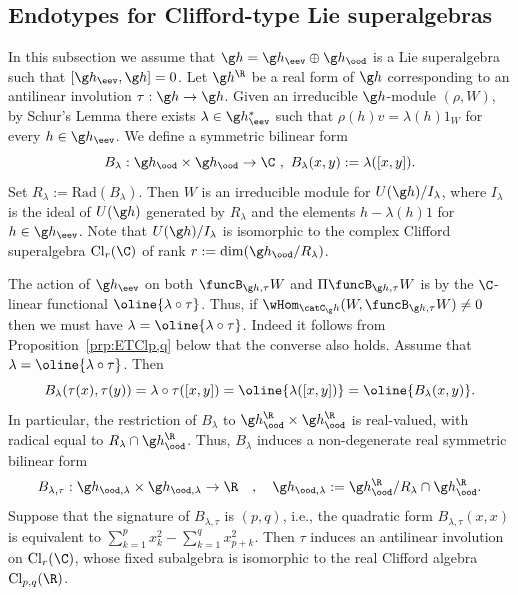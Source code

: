 \documentclass[12pt]{amsart}
\begin{document}
\subsection{Endotypes for Clifford-type Lie superalgebras}  
In  this subsection we assume that  $\g h=\g h_\eev\oplus\g h_\ood$ is a Lie superalgebra such that $[\g h_\eev,\g h]=0$. Let $\g h^\R$ be a real form of $\g h$ corresponding to an antilinear involution $\tau:\g h\to \g h$. Given an irreducible $\g h$-module $(\rho,W)$, by Schur's Lemma there exists $\lambda\in\g h_\eev^*$ such that  $\rho(h)v=\lambda(h)1_W$ for every $h\in \g h_\eev$.
We define a symmetric bilinear form
\[
B_\lambda:\g h_\ood\times \g h_\ood\to \C\ ,\
B_\lambda(x,y):=\lambda([x,y]).
\]
Set $R_\lambda:=\mathrm{Rad}(B_\lambda)$. Then $W$ is an irreducible module for $U(\g h)/I_\lambda$, where $I_\lambda$ is the ideal of $U(\g h)$ generated by $R_\lambda$ and the elements $h-\lambda(h)1$ for $h\in\g h_\eev$. Note that $U(\g h)/I_\lambda$ is isomorphic to the  complex Clifford superalgebra $\mathrm{Cl}_r(\C)$ of rank $r:=\dim(\g h_\ood/R_\lambda)$.  

%


The action of $\g h_\eev$ on both $\funcB_{\g h,\tau} W$ and $\Pi\funcB_{\g h,\tau} W$ is by the $\C$-linear functional $\oline{\lambda\circ\tau}$. Thus, if $\wHom_{\catC_\g h}(W,\funcB_{\g h,\tau}W)\neq 0$ then 
we must have $\lambda=\oline{\lambda\circ\tau}$. 
Indeed it follows from Proposition~\ref{prp:ETClp,q} below that the converse also holds. Assume that $\lambda=\oline{\lambda\circ\tau}$. Then
\[
B_\lambda(\tau(x),\tau(y))=\lambda\circ\tau([x,y])=\oline{\lambda([x,y])}=\oline{B_\lambda(x,y)}.
\]
In particular, the restriction of $B_\lambda$ to $\g h_\ood^\R\times \g h_\ood^\R$  is real-valued, with radical equal to 
$R_\lambda\cap \g h_\ood^\R$. 
Thus, $B_{\lambda}$ induces  a non-degenerate real symmetric bilinear form 
\begin{equation}
\label{eq:Blatau}
B_{\lambda,\tau}:\g h_{\ood,\lambda}\times\g h_{\ood,\lambda}\to\R\quad,\quad \g h_{\ood,\lambda}:=\g h_\ood^\R/R_\lambda\cap \g h_\ood^\R.
\end{equation}
Suppose that the signature of $B_{\lambda,\tau}$ is $(p,q)$, i.e., the quadratic form ${B}_{\lambda,\tau}(x,x)$ is equivalent to $\sum_{k=1}^px_k^2-\sum_{k=1}^q x_{p+k}^2$. Then 
$\tau$ induces an antilinear involution on $\mathrm{Cl}_r(\C)$, whose fixed subalgebra is isomorphic to the real Clifford algebra $\mathrm{Cl}_{p,q}(\R)$.
\end{document}
